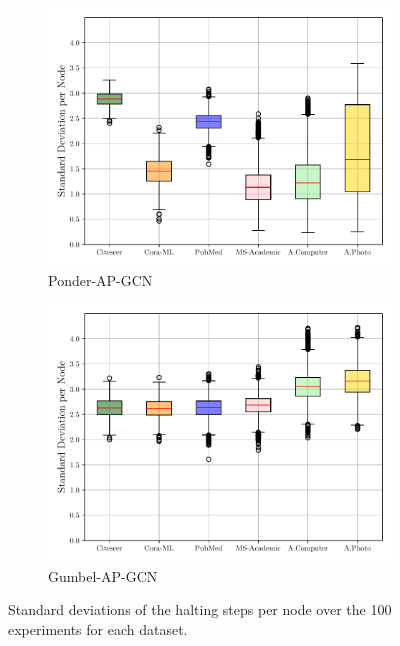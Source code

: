 \documentclass{gdl}
\begin{document}
\begin{figure}[p]
\begin{minipage}[t]{0.48\textwidth}
        \begin{subfigure}[b]{0.8\textwidth}
            \centering
            \includegraphics[width=\textwidth]{Ponder-AP-GCN_std_steps_per_node_boxplot.pdf}
            \captionsetup{justification=centerlast}
            \caption{Ponder-AP-GCN}
            \label{fig:step_std_Ponder_AP_GCN}
        \end{subfigure}
        
        \begin{subfigure}[b]{0.8\textwidth}
            \centering
            \includegraphics[width=\textwidth]{Gumbel-AP-GCN_std_steps_per_node_boxplot.pdf}
            \captionsetup{justification=centerlast}
            \caption{Gumbel-AP-GCN}
            \label{fig:step_std_Gumbel_AP_GCN}
        \end{subfigure}

        
        \captionsetup{justification=centerlast}
        \caption{Standard deviations of the halting steps per node over the 100 experiments for each dataset.}
        \label{fig:steps-dist-steps-std}
    \end{minipage}
\end{figure}
\end{document}

